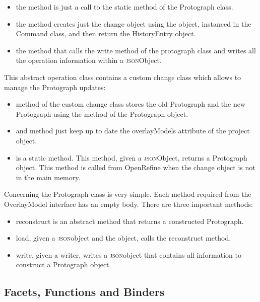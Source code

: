 \begin{itemize}
	\item the  method is just a call to the static  method of the Protograph class.
	\item the  method creates just the change object using the  object, instanced in the Command class, and then return the HistoryEntry object.
	\item the  method that calls the write method of the protograph class and writes all the operation information within a \textsc{json}Object.
\end{itemize}
This abstract operation class contains a custom change class which allows to manage the Protograph updates: 
\begin{itemize}
	\item {} method of the custom change class stores the old Protograph and the new Protograph using the  method of the Protograph object.
	\item {} and  method just keep up to date the overlayModels attribute of the project object.
	\item {} is a static method. This method, given a \textsc{json}Object, returns a Protograph object. This method is called from OpenRefine when the change object is not in the main memory.
\end{itemize}
Concerning the Protograph class is very simple. Each method required from the OverlayModel interface has an empty body. There are three important methods:
\begin{itemize}
	\item reconstruct is an abstract method that returns a constructed Protograph.
	\item load, given a \textsc{json}object and the  object, calls the reconstruct method. 
	\item write, given a writer, writes a \textsc{json}object that contains all information to construct a Protograph object.
\end{itemize}

\subsection{Facets, Functions and Binders}
